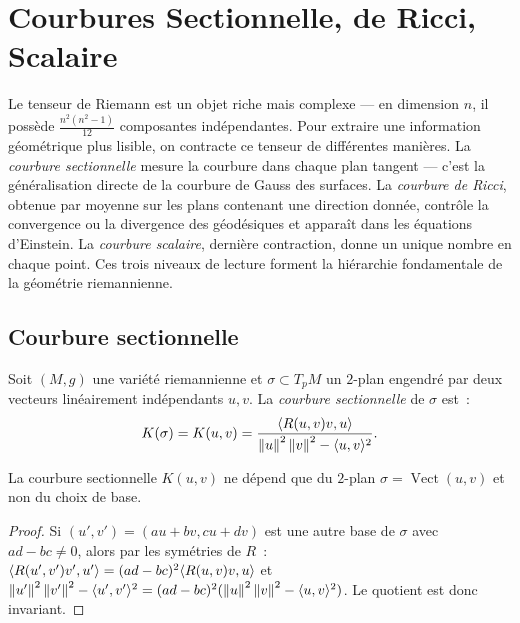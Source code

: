 \chapter{Courbures Sectionnelle, de Ricci, Scalaire}
\label{ch:courbures}

Le tenseur de Riemann est un objet riche mais complexe --- en dimension $n$, il poss\`ede $\frac{n^2(n^2-1)}{12}$ composantes ind\'ependantes. Pour extraire une information g\'eom\'etrique plus lisible, on contracte ce tenseur de diff\'erentes mani\`eres. La \emph{courbure sectionnelle} mesure la courbure dans chaque plan tangent --- c'est la g\'en\'eralisation directe de la courbure de Gauss des surfaces. La \emph{courbure de Ricci}, obtenue par moyenne sur les plans contenant une direction donn\'ee, contr\^ole la convergence ou la divergence des g\'eod\'esiques et appara\^it dans les \'equations d'Einstein. La \emph{courbure scalaire}, derni\`ere contraction, donne un unique nombre en chaque point. Ces trois niveaux de lecture forment la hi\'erarchie fondamentale de la g\'eom\'etrie riemannienne.

\section{Courbure sectionnelle}

\begin{definition}
Soit $(M, g)$ une vari\'et\'e riemannienne et $\sigma \subset T_pM$ un $2$-plan
engendr\'e par deux vecteurs lin\'eairement ind\'ependants $u, v$. La \emph{courbure
sectionnelle} de $\sigma$ est~:
\[
    K(\sigma) = K(u, v) = \frac{\langle R(u,v)v, u \rangle}{\left\| u \right\|^2\left\| v \right\|^2 - \langle u, v \rangle^2}.
\]
\end{definition}

\begin{proposition}
La courbure sectionnelle $K(u,v)$ ne d\'epend que du $2$-plan $\sigma = \operatorname{Vect}(u,v)$
et non du choix de base.
\end{proposition}

\begin{proof}
Si $(u', v') = (au + bv, cu + dv)$ est une autre base de $\sigma$ avec $ad - bc \neq 0$,
alors par les sym\'etries de $R$~:
$\langle R(u',v')v', u' \rangle = (ad-bc)^2 \langle R(u,v)v, u \rangle$
et $\left\| u' \right\|^2\left\| v' \right\|^2 - \langle u', v' \rangle^2 = (ad-bc)^2(\left\| u \right\|^2\left\| v \right\|^2 - \langle u, v \rangle^2)$.
Le quotient est donc invariant.
\end{proof}

